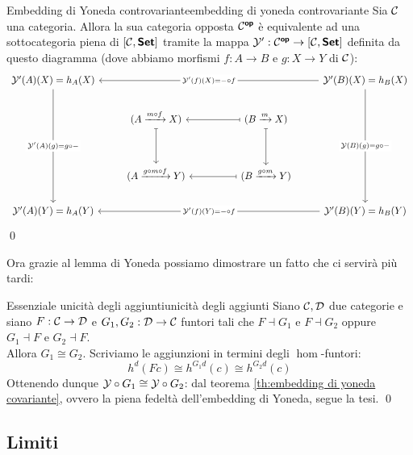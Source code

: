 \documentclass{article}
\renewcommand\C{\mc{C}}
\newcommand\D{\mc{D}}
\begin{document}
\begin{corollary}{Embedding di Yoneda controvariante}{embedding di yoneda controvariante}
    Sia $\C$ una categoria. Allora la sua categoria opposta $\C^\op$ è equivalente ad una sottocategoria piena di $[\C, \setcat]$ tramite la mappa $\mc{Y}' : \C^\op \to [\C, \setcat]$ definita da questo diagramma (dove abbiamo morfismi $f:A\to B$ e $g:X\to Y$ di $\C$):
    \[\begin{tikzcd}
    	{\mc{Y}'(A)(X) = h_A(X)} &&&& {\mc{Y}'(B)(X) = h_B(X)} \\
    	& {(A \xrightarrow{m\circ f} X)} && {(B \xrightarrow{m} X)} \\
    	\\
    	& {(A \xrightarrow{g\circ m\circ f} Y)} && {(B \xrightarrow{g\circ m} Y)} \\
    	{\mc{Y}'(A)(Y) = h_A(Y)} &&&& {\mc{Y}'(B)(Y) = h_B(Y)}
    	\arrow["{\mc{Y}'(A)(g) = g\circ -}"{description}, from=1-1, to=5-1]
    	\arrow["{\mc{Y}'(f)(X) = -\circ f}"{description}, from=1-5, to=1-1]
    	\arrow["{\mc{Y}(B)(g) = g\circ -}"{description}, from=1-5, to=5-5]
    	\arrow[maps to, from=2-2, to=4-2]
    	\arrow[maps to, from=2-4, to=2-2]
    	\arrow[maps to, from=2-4, to=4-4]
	    \arrow[maps to, from=4-4, to=4-2]
	    \arrow["{\mc{Y}'(f)(Y) = -\circ f}"{description}, from=5-5, to=5-1]
    \end{tikzcd}\]
    \qed
\end{corollary}

Ora grazie al lemma di Yoneda possiamo dimostrare un fatto che ci servirà più tardi:

\begin{lemma}{Essenziale unicità degli aggiunti}{unicità degli aggiunti}
    Siano $\C,\D$ due categorie e siano $F:\C\to\D$ e $G_1,G_2: \D\to\C$ funtori tali che $F\dashv G_1$ e $F\dashv G_2$ oppure $G_1\dashv F$ e $G_2\dashv F$.\\
    Allora $G_1\cong G_2$.
    \proof 
    Scriviamo le aggiunzioni in termini degli $\hom$-funtori:
    \[ h^d(Fc) \cong h^{G_1 d}(c) \cong h^{G_2 d}(c) \]
    Ottenendo dunque $\mathcal{Y}\circ G_1 \cong \mathcal{Y}\circ G_2$: dal teorema \ref{th:embedding di yoneda covariante}, ovvero la piena fedeltà dell'embedding di Yoneda, segue la tesi.
    \qed
\end{lemma}

\subsection{Limiti}
\end{document}
